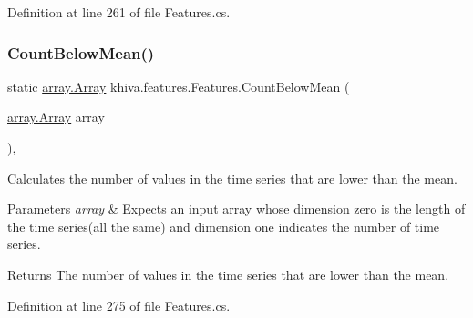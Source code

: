 Definition at line 261 of file Features.\+cs.

\mbox{\label{classkhiva_1_1features_1_1_features_a3b5f991bd9bf561b338f107a594775fd}} 
\subsubsection{\texorpdfstring{Count\+Below\+Mean()}{CountBelowMean()}}
{\footnotesize\ttfamily static \mbox{\hyperlink{classkhiva_1_1array_1_1_array}{array.\+Array}} khiva.\+features.\+Features.\+Count\+Below\+Mean (\begin{DoxyParamCaption}\item[{\mbox{\hyperlink{classkhiva_1_1array_1_1_array}{array.\+Array}}}]{array }\end{DoxyParamCaption})\hspace{0.3cm}{\ttfamily [inline]}, {\ttfamily [static]}}



Calculates the number of values in the time series that are lower than the mean. 


\begin{DoxyParams}{Parameters}
{\em array} & Expects an input array whose dimension zero is the length of the time series(all the same) and dimension one indicates the number of time series.\\
\hline
\end{DoxyParams}
\begin{DoxyReturn}{Returns}
The number of values in the time series that are lower than the mean.
\end{DoxyReturn}


Definition at line 275 of file Features.\+cs.

\mbox{\label{classkhiva_1_1features_1_1_features_a9df662ac943af3fe38bfc3e50f965c42}} 
